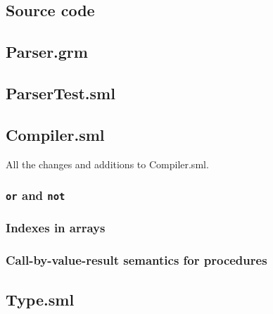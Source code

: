 \documentclass{article}
\newcommand{\Cfile}[4][SML]{ }
\begin{document}
\begin{appendix}
\section{Source code}
\subsection{Parser.grm}
    

\subsection{ParserTest.sml}
\label{parsertest}
    

\subsection{Compiler.sml}

All the changes and additions to Compiler.sml.

\subsubsection{\texttt{or} and \texttt{not}}

\Cfile{Compiler.sml}{253}{270}
%    
\subsubsection{Indexes in arrays}
\Cfile{Compiler.sml}{465}{521}
%    
\subsubsection{Call-by-value-result semantics for procedures}
\Cfile{Compiler.sml}{433}{454}
%    
\Cfile{Compiler.sml}{574}{582}
%    
\Cfile{Compiler.sml}{652}{692}
%    

\subsection{Type.sml}

\end{appendix}
\end{document}
